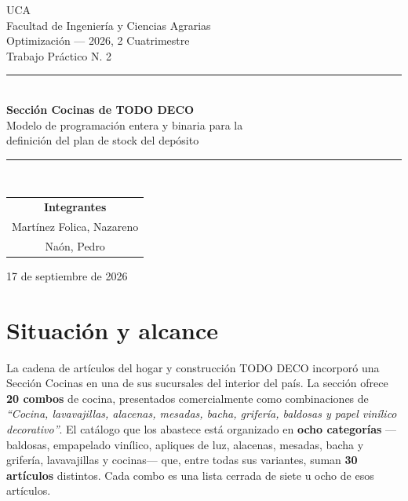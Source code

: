 \documentclass[10pt,a4paper]{article}
\newcommand{\cita}[1]{\emph{``#1''}}
\begin{document}
\begin{titlepage}
\begin{center}
\vspace*{1.2cm}
{\large UCA}\\[2pt]
{\large Facultad de Ingeniería y Ciencias Agrarias}\\[1.4cm]

{\large Optimización — 2026, 2\textdegree{} Cuatrimestre}\\[0.3cm]
{\large Trabajo Práctico N.\textdegree{} 2}\\[1.8cm]

\rule{0.85\linewidth}{0.6pt}\\[0.5cm]
{\Huge\bfseries\color{accent} Sección Cocinas de TODO DECO}\\[0.5cm]
{\Large Modelo de programación entera y binaria para la\\ definición del plan de stock del depósito}\\[0.5cm]
\rule{0.85\linewidth}{0.6pt}\\[2.2cm]

\begin{tabular}{c}
{\large\bfseries Integrantes} \\[0.4cm]
{\large Martínez Folica, Nazareno} \\[0.15cm]
{\large Naón, Pedro}
\end{tabular}

\vfill

{\large 17 de septiembre de 2026}
\end{center}
\end{titlepage}

\tableofcontents
\newpage
{}

\section{Situación y alcance}
\label{sec:situacion}

La cadena de artículos del hogar y construcción TODO DECO incorporó una Sección
Cocinas en una de sus sucursales del interior del país. La sección ofrece
\textbf{20 combos} de cocina, presentados comercialmente como combinaciones de
\cita{Cocina, lavavajillas, alacenas, mesadas, bacha, grifería, baldosas y papel
vinílico decorativo}. El catálogo que los abastece está organizado en
\textbf{ocho categorías} —baldosas, empapelado vinílico, apliques de luz,
alacenas, mesadas, bacha y grifería, lavavajillas y cocinas— que, entre todas
sus variantes, suman \textbf{30 artículos} distintos. Cada combo es una lista
cerrada de siete u ocho de esos artículos.
\end{document}
